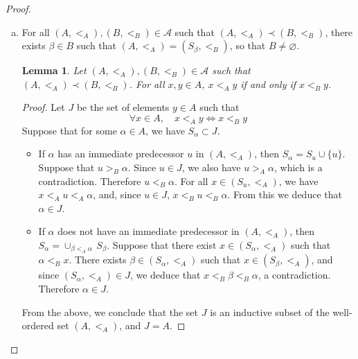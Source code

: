 \documentclass[11pt,a4paper,twoside]{article}
\theoremstyle{definition}
\theoremstyle{plain}
\newtheorem{lemma}{Lemma}
\begin{document}
\begin{proof}\hfill

  \begin{enumerate}[(a)]

  \item For all $( A, <_A ), ( B, <_B ) \in \mathscr{A}$ such that $( A, <_A ) \prec ( B, <_B )$,
    there exists $\beta \in B$ such that $( A, <_A ) = ( S_\beta, <_B )$, so that $B \neq \varnothing$.

    \bigskip
    \begin{lemma}\label{lemma:order_equivalence}
      Let $( A, <_A ), ( B, <_B ) \in \mathscr{A}$ such that $( A, <_A ) \prec ( B, <_B )$.
      For all $x, y \in A$, $x <_A y$ if and only if $x <_B y$.
    \end{lemma}

    \begin{proof}

      Let $J$ be the set of elements $y \in A$ such that
      \begin{equation*}
        \forall x \in A, \quad x <_A y \iff x <_B y
      \end{equation*}
      Suppose that for some $\alpha \in A$, we have $S_\alpha \subset J$.
      \begin{itemize}

      \item If $\alpha$ has an immediate predecessor $u$ in $( A, <_A )$, then $S_\alpha = S_u \cup \{ u \}$.
        Suppose that $u >_B \alpha$. Since $u \in J$, we also have $u >_A \alpha$, which is a contradiction.
        Therefore $u <_B \alpha$. For all $x \in ( S_u, <_A )$, we have $x <_A u <_A \alpha$, and, since $u \in J$,
        $x <_B u <_B \alpha$. From this we deduce that $\alpha \in J$.

      \item If $\alpha$ does not have an immediate predecessor in $( A, <_A )$, then $S_\alpha = \cup_{\beta <_A \alpha} \,S_\beta$.
        Suppose that there exist $x \in ( S_\alpha, <_A )$ such that $\alpha <_B x$. There exists $\beta \in ( S_\alpha, <_A )$
        such that $x \in ( S_\beta, <_A )$, and since $( S_\alpha, <_A ) \in J$, we deduce that $x <_B \beta <_B \alpha$,
        a contradiction. Therefore $\alpha \in J$.

      \end{itemize}
      From the above, we conclude that the set $J$ is an inductive subset of the well-ordered set $( A, <_A )$,
      and $J = A$.

    \end{proof}


\end{enumerate}
\end{proof}
\end{document}
